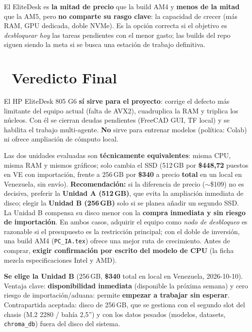 \documentclass[11pt,a4paper]{article}
\newcommand{\iconotexto}[2]{\textcolor{cyanNeon}{\faIcon{#1}}~#2}
\begin{document}
\begin{cajaConcepto}
El EliteDesk es \textbf{la mitad de precio} que la build AM4 y \textbf{menos de la mitad}
que la AM5, pero \textbf{no comparte su rasgo clave}: la capacidad de crecer (más RAM,
GPU dedicada, doble NVMe). Es la opción correcta si el objetivo es \emph{desbloquear
hoy} las tareas pendientes con el menor gasto; las builds del repo siguen siendo la
meta si se busca una estación de trabajo definitiva.
\end{cajaConcepto}

\section[Veredicto Final]{\iconotexto{flag-checkered}{Veredicto Final}}

\begin{tcolorbox}[cajaFortaleza, title={\faIcon{thumbs-up}~Conclusión}]
El HP EliteDesk 805 G6 \textbf{sí sirve para el proyecto}: corrige el defecto más
limitante del equipo actual (falta de AVX2), cuadruplica la RAM y triplica los núcleos.
Con él se cierran deudas pendientes (FreeCAD GUI, TF local) y se habilita el trabajo
multi-agente. \textbf{No} sirve para entrenar modelos (política: Colab) ni ofrece
ampliación de cómputo local.

Las dos unidades evaluadas son \textbf{técnicamente equivalentes}: misma CPU, misma RAM y
mismos gráficos; solo cambia el SSD (512\,GB por \textbf{\$448{,}72} puestos en VE con
importación, frente a 256\,GB por \textbf{\$340} a precio \textbf{total} en un local en
Venezuela, sin envío). \textbf{Recomendación:} si la diferencia de precio
($\sim$\$109) no es decisiva, preferir la \textbf{Unidad A (512\,GB)}, que evita la
ampliación inmediata de disco; elegir la \textbf{Unidad B (256\,GB)} solo si se planea
añadir un segundo SSD. La Unidad B compensa su disco menor con la \textbf{compra
inmediata y sin riesgo de importación}. En ambos casos, adquirir el equipo como
\emph{nodo de desbloqueo} es razonable si el presupuesto es la restricción principal; con
el doble de inversión, una build AM4 (\texttt{PC\_IA.tex}) ofrece una mejor ruta de
crecimiento. Antes de comprar, \textbf{exigir confirmación por escrito del modelo de CPU}
(la ficha mezcla especificaciones Intel y AMD).
\end{tcolorbox}

\begin{tcolorbox}[cajaMejora, title={\faIcon{gavel}~Decisión tomada --- Unidad B}]
\textbf{Se elige la Unidad B} (256\,GB, \textbf{\$340} total en local en Venezuela,
2026-10-10). Ventaja clave: \textbf{disponibilidad inmediata} (disponible la próxima
semana) y cero riesgo de importación/aduana: permite \textbf{empezar a trabajar sin
esperar}. Contrapartida aceptada: disco de 256\,GB, que se gestiona con el segundo slot
del chasis (M.2 2280 / bahía 2{,}5'') y con los datos pesados (modelos, datasets,
\texttt{chroma\_db}) fuera del disco del sistema.
\end{tcolorbox}
\end{document}
